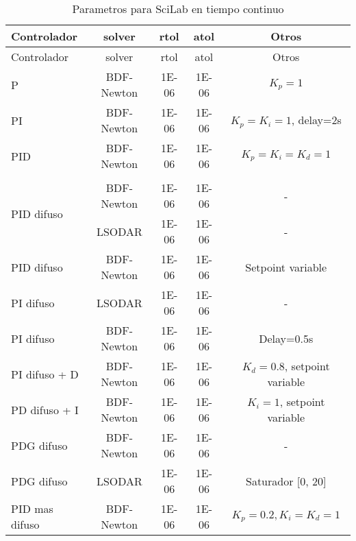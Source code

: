         {\setlength\LTleft{0pt}
        \setlength\LTright{0pt}
        \centering
        \footnotesize
        \renewcommand{\arraystretch}{0.89}
        \begin{longtable}{l @{\extracolsep{\fill}} cccc}
        \caption[Parametros para SciLab en tiempo continuo]{Parametros para SciLab en tiempo continuo} 
        \label{tab:parametrosSciLabc} \\
        \toprule
        Controlador  & solver & rtol & atol & Otros       \\ \midrule
        \endfirsthead
        \toprule
        Controlador  & solver & rtol & atol & Otros       \\ \midrule
        \endhead
        \bottomrule
        \endfoot
         P                          & BDF-Newton   & \num{1E-06}   & \num{1E-06}          & $K_p=1$                       \\
         PI                         & BDF-Newton   & \num{1E-06}   & \num{1E-06}          & $K_p=K_i=1$, delay=2s         \\
         PID                        & BDF-Newton   & \num{1E-06}   & \num{1E-06}          & $K_p=K_i=K_d=1$               \\
         &&&& \\[-3pt]        
         \multirow{2}{*}{PID difuso}& BDF-Newton   & \num{1E-06}   & \num{1E-06}          & -                             \\
                                    & LSODAR       & \num{1E-06}   & \num{1E-06}          & -                             \\
         PID difuso                 & BDF-Newton   & \num{1E-06}   & \num{1E-06}          & Setpoint variable             \\
         PI difuso                  & LSODAR       & \num{1E-06}   & \num{1E-06}          & -                             \\
         PI difuso                  & BDF-Newton   & \num{1E-06}   & \num{1E-06}          & Delay=0.5s                    \\
         PI difuso + D              & BDF-Newton   & \num{1E-06}   & \num{1E-06}          & $K_d=0.8$, setpoint variable  \\
         PD difuso + I              & BDF-Newton   & \num{1E-06}   & \num{1E-06}          & $K_i=1$, setpoint variable    \\
         PDG difuso                 & BDF-Newton   & \num{1E-06}   & \num{1E-06}          & -                             \\
         PDG difuso                 & LSODAR       & \num{1E-06}   & \num{1E-06}          & Saturador [0, 20]             \\
         PID mas difuso             & BDF-Newton   & \num{1E-06}   & \num{1E-06}          & $K_p=0.2, K_i=K_d=1$          \\
        \end{longtable}}

